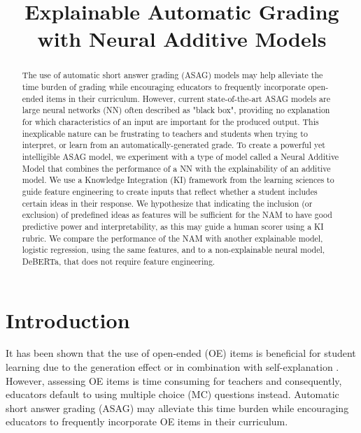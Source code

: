 
\title{Explainable Automatic Grading with Neural Additive Models}
\maketitle              \begin{abstract}
The use of automatic short answer grading (ASAG) models may help alleviate the time burden of grading while encouraging educators to frequently incorporate open-ended items in their curriculum. However, current state-of-the-art ASAG models are large neural networks (NN) often described as "black box", providing no explanation for which characteristics of an input are important for the produced output. This inexplicable nature can be frustrating to teachers and students when trying to interpret, or learn from an automatically-generated grade. To create a powerful yet intelligible ASAG model, we experiment with a type of model called a Neural Additive Model that combines the performance of a NN with the explainability of an additive model. We use a Knowledge Integration (KI) framework from the learning sciences to guide feature engineering to create inputs that reflect whether a student includes certain ideas in their response. We hypothesize that indicating the inclusion (or exclusion) of predefined ideas as features will be sufficient for the NAM to have good predictive power and interpretability, as this may guide a human scorer using a KI rubric. We compare the performance of the NAM with another explainable model, logistic regression, using the same features, and to a non-explainable neural model, DeBERTa, that does not require feature engineering.

\end{abstract}
\section{Introduction}
It has been shown that the use of open-ended (OE) items is beneficial for student learning due to the generation effect \cite{bertsch2007generation} or in combination with self-explanation \cite{chi1994eliciting}. However, assessing OE items is time consuming for teachers \cite{hancock1995implementing} and consequently, educators default to using multiple choice (MC) questions instead. Automatic short answer grading (ASAG) may alleviate this time burden while encouraging educators to frequently incorporate OE items in their curriculum. 

